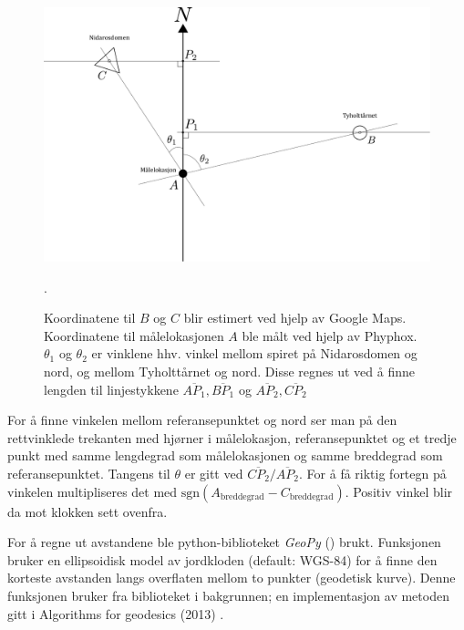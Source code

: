 \begin{figure}
    \centering
    \includegraphics[width=\textwidth]{img/angle_north.pdf}
    \caption{Koordinatene til $B$ og $C$ blir estimert ved hjelp av Google Maps. 
    Koordinatene til målelokasjonen $A$ ble målt ved hjelp av Phyphox.
    $\theta_1$ og $\theta_2$ er vinklene hhv. vinkel mellom spiret på Nidarosdomen og nord, og mellom Tyholttårnet og nord. 
    Disse regnes ut ved å finne lengden til linjestykkene $\overline{AP_1}, \overline{BP_1}$ og $\overline{AP_2}, \overline{CP_2}$}.
    \label{fig:angle_north}
\end{figure}

For å finne vinkelen mellom referansepunktet og nord ser man på den rettvinklede trekanten med hjørner i målelokasjon, referansepunktet og et tredje punkt med samme lengdegrad som målelokasjonen og samme breddegrad som referansepunktet.
Tangens til $\theta$ er gitt ved $\overline{CP_2} / \overline{AP_2}$.
For å få riktig fortegn på vinkelen multipliseres det med $\text{sgn}(A_{\text{breddegrad}} - C_{\text{breddegrad}})$. Positiv vinkel blir da mot klokken sett ovenfra.
\par
For å regne ut avstandene ble python-biblioteket \textit{GeoPy} (\cite{geopy}) brukt. Funksjonen  bruker en ellipsoidisk model av jordkloden (default: WGS-84) for å finne den korteste avstanden langs overflaten mellom to punkter (geodetisk kurve). 
 Denne funksjonen bruker  fra biblioteket  i bakgrunnen; en implementasjon av metoden gitt i Algorithms for geodesics (2013) \cite{Karney}. 



